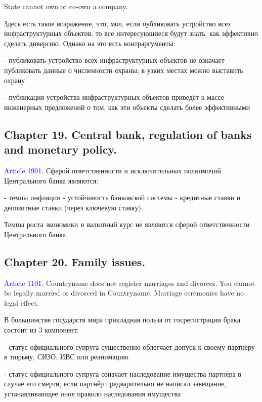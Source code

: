\documentclass[11pt]{article}
\theoremstyle{remark}
\theoremstyle{definition}
\begin{document}
State cannot own or co-own a company.




Здесь есть такое возражение, что, мол, если публиковать устройство всех инфраструктурных объектов, то все интересующиеся будут знать, как эффективно сделать диверсию. Однако на это есть контраргументы:

- публиковать устройство всех инфраструктурных объектов не означает публиковать данные о численности охраны; в узких местах можно выставить охрану

- публикация устройства инфраструктурных объектов приведёт к массе инженерных предложений о том, как эти объекты сделать более эффективными




\subsection*{Chapter 19. Central bank, regulation of banks and monetary policy.}

\textcolor{blue}{Article 1901.} Сферой ответственности и исключительных полномочий Центрального банка являются:

- темпы инфляции
- устойчивость банковской системы
- кредитные ставки и депозитные ставки (через ключевую ставку).

Темпы роста экономики и валютный курс не являются сферой ответственности Центрального банка.

\color{blue}




\color{black}

\subsection*{Chapter 20. Family issues.}






\textcolor{blue}{Article 1101.} Countryname does not register marriages and divorces. You cannot be legally married or divorced in Countryname. Marriage ceremonies have no legal effect.

\color{blue}



В большинстве государств мира прикладная польза от госрегистрации брака состоит из 3 компонент:

- статус официального супруга существенно облегчает допуск к своему партнёру в тюрьму, СИЗО, ИВС или реанимацию

- статус официального супруга означает наследование имущества партнёра в случае его смерти, если партнёр предварительно не написал завещание, устанавливающее иное правило наследования имущества
\end{document}
